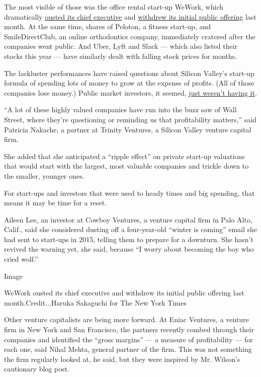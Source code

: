 The most visible of those was the office rental start-up WeWork, which
dramatically
\href{https://www.nytimes3xbfgragh.onion/2019/09/24/business/dealbook/wework-ceo-adam-neumann.html}{ousted
its chief executive} and
\href{https://www.nytimes3xbfgragh.onion/2019/09/30/business/wework-ipo.html}{withdrew
its initial public offering} last month. At the same time, shares of
Peloton, a fitness start-up, and SmileDirectClub, an online orthodontics
company, immediately cratered after the companies went public. And Uber,
Lyft and Slack --- which also listed their stocks this year --- have
similarly dealt with falling stock prices for months.

The lackluster performances have raised questions about Silicon Valley's
start-up formula of spending lots of money to grow at the expense of
profits. (All of those companies lose money.) Public market investors,
it seemed,
\href{https://www.nytimes3xbfgragh.onion/2019/09/26/business/tech-ipo-market.html}{just
weren't having it}.

``A lot of these highly valued companies have run into the buzz saw of
Wall Street, where they're questioning or reminding us that
profitability matters,'' said Patricia Nakache, a partner at Trinity
Ventures, a Silicon Valley venture capital firm.

She added that she anticipated a ``ripple effect'' on private start-up
valuations that would start with the largest, most valuable companies
and trickle down to the smaller, younger ones.

For start-ups and investors that were used to heady times and big
spending, that means it may be time for a reset.

Aileen Lee, an investor at Cowboy Ventures, a venture capital firm in
Palo Alto, Calif., said she considered dusting off a four-year-old
``winter is coming'' email she had sent to start-ups in 2015, telling
them to prepare for a downturn. She hasn't revived the warning yet, she
said, because ``I worry about becoming the boy who cried wolf.''

Image

WeWork ousted its chief executive and withdrew its initial public
offering last month.Credit...Haruka Sakaguchi for The New York Times

Other venture capitalists are being more forward. At Eniac Ventures, a
venture firm in New York and San Francisco, the partners recently combed
through their companies and identified the ``gross margins'' --- a
measure of profitability --- for each one, said Nihal Mehta, general
partner of the firm. This was not something the firm regularly looked
at, he said, but they were inspired by Mr. Wilson's cautionary blog
post.

